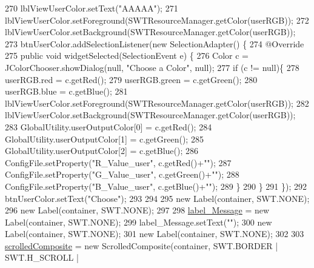 \begin{DoxyCode}
270         lblViewUserColor.setText(\textcolor{stringliteral}{"AAAAA"});
271         lblViewUserColor.setForeground(SWTResourceManager.getColor(userRGB));
272         lblViewUserColor.setBackground(SWTResourceManager.getColor(userRGB));
273         btnUserColor.addSelectionListener(\textcolor{keyword}{new} SelectionAdapter() \{
274             @Override
275             \textcolor{keyword}{public} \textcolor{keywordtype}{void} widgetSelected(SelectionEvent e) \{
276                 Color c = JColorChooser.showDialog(null, \textcolor{stringliteral}{"Choose a Color"}, null);
277                   \textcolor{keywordflow}{if} (c != null)\{
278                       userRGB.red = c.getRed();
279                       userRGB.green = c.getGreen();
280                       userRGB.blue = c.getBlue();
281                       lblViewUserColor.setForeground(SWTResourceManager.getColor(userRGB));
282                       lblViewUserColor.setBackground(SWTResourceManager.getColor(userRGB));
283                       GlobalUtility.userOutputColor[0] = c.getRed();
284                       GlobalUtility.userOutputColor[1] = c.getGreen();
285                       GlobalUtility.userOutputColor[2] = c.getBlue();
286                       ConfigFile.setProperty(\textcolor{stringliteral}{"R\_Value\_user"}, c.getRed()+\textcolor{stringliteral}{""});
287                       ConfigFile.setProperty(\textcolor{stringliteral}{"G\_Value\_user"}, c.getGreen()+\textcolor{stringliteral}{""});
288                       ConfigFile.setProperty(\textcolor{stringliteral}{"B\_Value\_user"}, c.getBlue()+\textcolor{stringliteral}{""});
289                   \}
290             \}
291         \});
292         btnUserColor.setText(\textcolor{stringliteral}{"Choose"});
293         
294         
295         \textcolor{keyword}{new} Label(container, SWT.NONE);
296         \textcolor{keyword}{new} Label(container, SWT.NONE);
297         
298         \hyperlink{classit_1_1isislab_1_1masonhelperdocumentation_1_1mason_1_1wizards_1_1_b___project_information_page_a92c697e221a10de24614780a6bdb2d3a}{label\_Message} = \textcolor{keyword}{new} Label(container, SWT.NONE);
299         label\_Message.setText(\textcolor{stringliteral}{""});
300         \textcolor{keyword}{new} Label(container, SWT.NONE);
301         \textcolor{keyword}{new} Label(container, SWT.NONE);
302         
303         \hyperlink{classit_1_1isislab_1_1masonhelperdocumentation_1_1mason_1_1wizards_1_1_b___project_information_page_aefd8edc54e474960b861b1071734298d}{scrolledComposite} = \textcolor{keyword}{new} ScrolledComposite(container, SWT.BORDER | SWT.H\_SCROLL | 

\end{DoxyCode}
